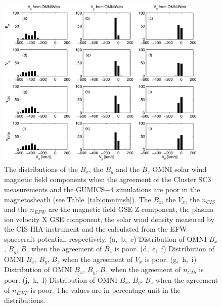\documentclass[linenumbers,draft]{agujournal}
\begin{document}
\begin{figure}[h]
\centering
\includegraphics[width=0.9\textwidth,angle=0]{swe-2020-corr-f18.eps}
\caption{The distributions of the $B_{x}$, the $B_{y}$  and the $B_{z}$ OMNI solar wind magnetic field components when the agreement of the Cluster SC3 measurements and the GUMICS$-$4 simulations are poor in the magnetosheath (see Table~\ref{tab:omnimsh}). The $B_{z}$, the $V_{x}$, the $n_{CIS}$ and the $n_{EFW}$ are the magnetic field GSE Z component, the plasma ion velocity X GSE component, the  solar wind density measured by the CIS HIA instrument and the calculated from the EFW spacecraft potential, respectively. (a,~b,~c) Distribution of OMNI $B_{x}$, $B_{y}$, $B_{z}$ when the agreement of $B_{z}$ is poor. (d,~e,~f) Distribution of OMNI  $B_{x}$, $B_{y}$, $B_{z}$ when the agreement of $V_{x}$ is poor. (g,~h,~i) Distribution of OMNI $B_{x}$, $B_{y}$, $B_{z}$ when the agreement of $n_{CIS}$ is poor. (j,~k,~l) Distribution of OMNI $B_{x}$, $B_{y}$, $B_{z}$ when the agreement of $n_{EWF}$ is poor. The values are in percentage unit in the distributions.}
\label{fig:mshomnibxyz}
\end{figure}

\pagebreak
\end{document}
